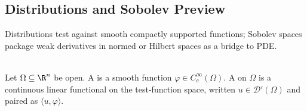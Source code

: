 \subsection{Distributions and Sobolev Preview}

%

Distributions test against smooth compactly supported functions; Sobolev spaces package weak derivatives in normed or Hilbert spaces as a bridge to PDE.

\begin{definition} \label{def:test-functions-and-distributions} \\
Let $\Omega\subseteq\R^n$ be open. A  is a smooth function $\varphi\in C_c^\infty(\Omega)$. A  on $\Omega$ is a continuous linear functional on the test-function space, written $u\in\mathcal{D}'(\Omega)$ and paired as $\langle u,\varphi\rangle$.
\end{definition}
